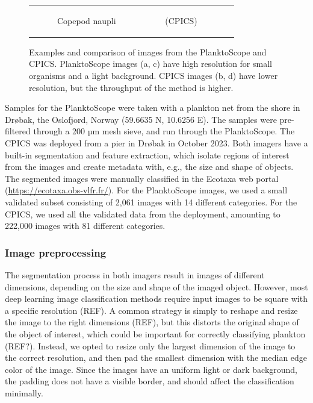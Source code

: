 \begin{figure}[t]
\begin{tabular}{cc}
\begin{subfigure}[b]{0.49\linewidth}
            \caption{Copepod naupli \ \ \ \ \ \ \ \ \ \ \  (CPICS)}
            \label{fig:naupli-cpics}
        \end{subfigure}
    \end{tabular}
    \caption{Examples and comparison of images from the PlanktoScope and CPICS. PlanktoScope images (a, c) have high resolution for small organisms and a light background. CPICS images (b, d) have lower resolution, but the throughput of the method is higher.}
    \label{fig:plankton-img}
\end{figure}

Samples for the PlanktoScope were taken with a plankton net from the shore in Drøbak, the Oslofjord, Norway (59.6635 N, 10.6256 E). The samples were pre-filtered through a 200 µm mesh sieve, and run through the PlanktoScope. The CPICS was deployed from a pier in Drøbak in October 2023. Both imagers have a built-in segmentation and feature extraction, which isolate regions of interest from the images and create metadata with, e.g., the size and shape of objects. The segmented images were manually classified in the Ecotaxa web portal (\hyperlink{https://ecotaxa.obs-vlfr.fr/}{https://ecotaxa.obs-vlfr.fr/}). For the PlanktoScope images, we used a small validated subset consisting of 2,061 images with 14 different categories. For the CPICS, we used all the validated data from the deployment, amounting to 222,000 images with 81 different categories.

\subsubsection{Image preprocessing}

The segmentation process in both imagers result in images of different dimensions, depending on the size and shape of the imaged object. However, most deep learning image classification methods require input images to be square with a specific resolution (REF). A common strategy is simply to reshape and resize the image to the right dimensions (REF), but this distorts the original shape of the object of interest, which could be important for correctly classifying plankton (REF?). Instead, we opted to resize only the largest dimension of the image to the correct resolution, and then pad the smallest dimension with the median edge color of the image. Since the images have an uniform light or dark background, the padding does not have a visible border, and should affect the classification minimally.


%

%
%

%
%
